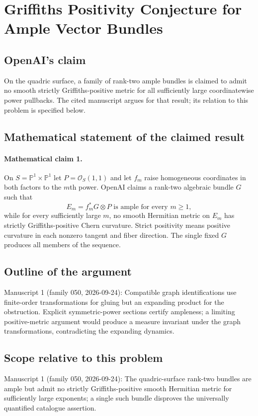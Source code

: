 \documentclass[11pt]{article}
\begin{document}
\section*{Griffiths Positivity Conjecture for Ample Vector Bundles}

\subsection{OpenAI's claim}
On the quadric surface, a family of rank-two ample bundles is claimed to admit no smooth strictly Griffiths-positive metric for all sufficiently large coordinatewise power pullbacks. The cited manuscript argues for that result; its relation to this problem is specified below.

\subsection{Mathematical statement of the claimed result}
\paragraph{Mathematical claim 1.} On $S=\mathbb P^1\times\mathbb P^1$ let $P=\mathcal O_S(1,1)$ and let $f_m$ raise homogeneous coordinates in both factors to the $m$th power. OpenAI claims a rank-two algebraic bundle $G$ such that
\[
E_m=f_m^*G\otimes P\text{ is ample for every }m\ge1,
\]
while for every sufficiently large $m$, no smooth Hermitian metric on $E_m$ has strictly Griffiths-positive Chern curvature. Strict positivity means positive curvature in each nonzero tangent and fiber direction. The single fixed $G$ produces all members of the sequence.

\subsection{Outline of the argument}
Manuscript 1 (family 050, 2026-09-24): Compatible graph identifications use finite-order transformations for gluing but an expanding product for the obstruction. Explicit symmetric-power sections certify ampleness; a limiting positive-metric argument would produce a measure invariant under the graph transformations, contradicting the expanding dynamics.

\subsection{Scope relative to this problem}
Manuscript 1 (family 050, 2026-09-24): The quadric-surface rank-two bundles are ample but admit no strictly Griffiths-positive smooth Hermitian metric for sufficiently large exponents; a single such bundle disproves the universally quantified catalogue assertion.
\end{document}
